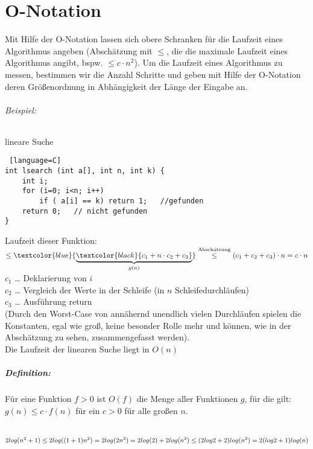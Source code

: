 \chapter{O-Notation}
Mit Hilfe der O-Notation lassen sich obere Schranken für die Laufzeit eines Algorithmus angeben (Abschätzung mit $\leq$, die die maximale Laufzeit eines Algorithmus angibt, bspw. $\leq c \cdot n^2$). Um die Laufzeit eines Algorithmus zu messen, bestimmen wir die Anzahl Schritte und geben mit Hilfe der O-Notation deren Größenordnung in Abhängigkeit der Länge der Eingabe an.

\subparagraph{Beispiel:} lineare Suche
\begin{lstlisting} [language=C]
int lsearch (int a[], int n, int k) {
	int i;
	for (i=0; i<n; i++)
		if ( a[i] == k) return 1;	//gefunden
	return 0;	// nicht gefunden
}
\end{lstlisting}
Laufzeit dieser Funktion:\\
$\leq \textcolor{blue}{\underbrace{\textcolor{black}{c_1+ n\cdot c_2+c_3}}_{g(n)}} \overset{\text{Abschätzung}}{\leq}(c_1+c_2+c_3)\cdot n= c \cdot n$\\
$c_1$ … Deklarierung von $i$\\
$c_2$ … Vergleich der Werte in der Schleife (in $n$ Schleifedurchläufen)\\
$c_3$ … Ausführung return\\
(Durch den Worst-Case von annähernd unendlich vielen Durchläufen spielen die Konstanten, egal wie groß, keine besonder Rolle mehr und können, wie in der Abschätzung zu sehen, zusammengefasst werden).\\
Die Laufzeit der linearen Suche liegt in $O(n)$

\paragraph{Definition:} Für eine Funktion $f>0$ ist $O(f)$ die Menge aller Funktionen $g$, für die gilt:\\
$g(n)\leq c\cdot f(n)$ für ein $c>0$ für alle großen $n$.\\
\\
$
2 log (n^2+1)\\
\leq 2 log ((1+1)n^2)\\
=2 log (2n^2)\\
= 2 log (2) + 2 log( n^2)\\
\leq (2log2+2)log(n^2)\\
= 2 (log2+1)log(n)
$

